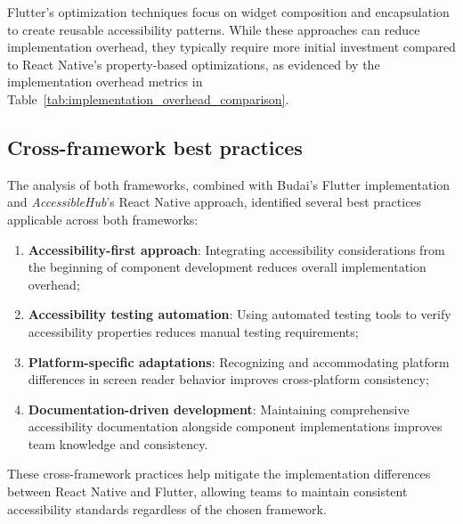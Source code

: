 Flutter's optimization techniques focus on widget composition and encapsulation to create reusable accessibility patterns. While these approaches can reduce implementation overhead, they typically require more initial investment compared to React Native's property-based optimizations, as evidenced by the implementation overhead metrics in Table~\ref{tab:implementation_overhead_comparison}.

\subsection{Cross-framework best practices}
\label{subsec:cross-framework-practices}

The analysis of both frameworks, combined with Budai's Flutter implementation and \textit{AccessibleHub}'s React Native approach, identified several best practices applicable across both frameworks:

\begin{enumerate}
    \item \textbf{Accessibility-first approach}: Integrating accessibility considerations from the beginning of component development reduces overall implementation overhead;
    
    \item \textbf{Accessibility testing automation}: Using automated testing tools to verify accessibility properties reduces manual testing requirements;
    
    \item \textbf{Platform-specific adaptations}: Recognizing and accommodating platform differences in screen reader behavior improves cross-platform consistency;
    
    \item \textbf{Documentation-driven development}: Maintaining comprehensive accessibility documentation alongside component implementations improves team knowledge and consistency.
\end{enumerate}

These cross-framework practices help mitigate the implementation differences between React Native and Flutter, allowing teams to maintain consistent accessibility standards regardless of the chosen framework.
